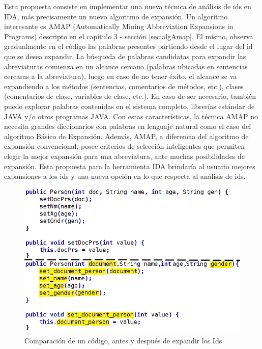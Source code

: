 Esta propuesta consiste en implementar una nueva técnica de análisis de ids en IDA, más precisamente un nuevo algoritmo de expansión. Un algoritmo interesante es AMAP (Automatically Mining Abbreviation Expansions in Programs) descripto en el capítulo 3 - sección \ref{sec:algAmap}. El mismo, observa gradualmente en el código las palabras presentes partiendo desde el lugar del id que se desea expandir.
La búsqueda de palabras candidatas para expandir las abreviaturas comienza en un alcance cercano (palabras ubicadas en sentencias cercaras a la abreviatura), luego en caso de no tener éxito, el alcance se va expandiendo a los métodos (sentencias, comentarios de métodos, etc.), clases (comentarios de clase, variables de clase, etc.). En caso de ser necesario, también puede explorar palabras contenidas en el sistema completo, librerías estándar de JAVA y/o otros programas JAVA. 
Con estas características, la técnica AMAP no necesita grandes diccionarios con palabras en lenguaje natural como el caso del algoritmo Básico de Expansión.
Además, AMAP, a diferencia del algoritmo de expansión convencional, posee criterios de selección inteligentes que permiten elegir la mejor expansión para una abreviatura, ante muchas posibilidades de expansión.
Esta propuesta para la herramienta IDA brindaría al usuario mejores expansiones a los ids y una nueva opción en lo que respecta al análisis de ids.

\begin{figure}[t] %
\centerline{%
\includegraphics[scale= 0.52]{./cap6/cod.png}
}
\caption{Comparación de un código, antes y después de expandir los Ids}
\label{cod}
\end{figure}

